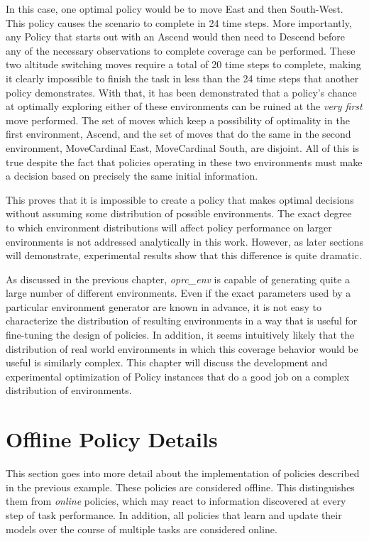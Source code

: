 In this case, one optimal policy would be to move East and then South-West. This policy causes the scenario to complete in 24 time steps. More importantly, any Policy that starts out with an Ascend would then need to Descend before any of the necessary observations to complete coverage can be performed. These two altitude switching moves require a total of 20 time steps to complete, making it clearly impossible to finish the task in less than the 24 time steps that another policy demonstrates. With that, it has been demonstrated that a policy's chance at optimally exploring either of these environments can be ruined at the \textit{very first} move performed. The set of moves which keep a possibility of optimality in the first environment, {Ascend}, and the set of moves that do the same in the second environment, {MoveCardinal East, MoveCardinal South}, are disjoint. All of this is true despite the fact that policies operating in these two environments must make a decision based on precisely the same initial information.

This proves that it is impossible to create a policy that makes optimal decisions without assuming some distribution of possible environments. The exact degree to which environment distributions will affect policy performance on larger environments is not addressed analytically in this work. However, as later sections will demonstrate, experimental results show that this difference is quite dramatic.

As discussed in the previous chapter, \textit{oprc\_env} is capable of generating quite a large number of different environments. Even if the exact parameters used by a particular environment generator are known in advance, it is not easy to characterize the distribution of resulting environments in a way that is useful for fine-tuning the design of policies. In addition, it seems intuitively likely that the distribution of real world environments in which this coverage behavior would be useful is similarly complex. This chapter will discuss the development and experimental optimization of Policy instances that do a good job on a complex distribution of environments.

\section{Offline Policy Details}

This section goes into more detail about the implementation of policies described in the previous example. These policies are considered offline. This distinguishes them from \textit{online} policies, which may react to information discovered at every step of task performance. In addition, all policies that learn and update their models over the course of multiple tasks are considered online.

